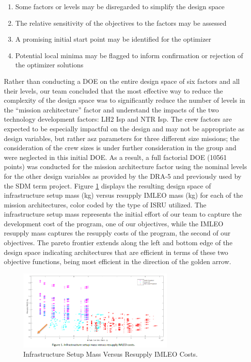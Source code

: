 \documentclass[]{aiaa-pretty}
\begin{document}
\begin{enumerate}
\item Some factors or levels may be disregarded to simplify the design space
\item The relative sensitivity of the objectives to the factors may be assessed
\item A promising initial start point may be identified for the optimizer
\item Potential local minima may be flagged to inform confirmation or rejection of the optimizer solutions
\end{enumerate}
Rather than conducting a DOE on the entire design space of six factors and all their levels, our team concluded that the most effective way to reduce the complexity of the design space was to significantly reduce the number of levels in the “mission architecture” factor and understand the impacts of the two technology development factors: LH2 Isp and NTR Isp. The crew factors are expected to be especially impactful on the design and may not be appropriate as design variables, but rather asz parameters for three different size missions; the consideration of the crew sizes is under further consideration in the group and were neglected in this initial DOE. As a result, a full factorial DOE (10561 points) was conducted for the mission architecture factor using the nominal levels for the other design variables as provided by the DRA-5 and previously used by the SDM term project. Figure \ref{fig:infratrade} displays the resulting design space of infrastructure setup mass (kg) versus resupply IMLEO mass (kg) for each of the mission architectures, color coded by the type of ISRU utilized. The infrastructure setup mass represents the initial effort of our team to capture the development cost of the program, one of our objectives, while the IMLEO resupply mass captures the resupply costs of the program, the second of our objectives. The pareto frontier extends along the left and bottom edge of the design space indicating architectures that are efficient in terms of these two objective functions, being most efficient in the direction of the golden arrow.

\begin{figure}[h!]
	\centering
	\includegraphics[width=0.7\textwidth]{InfraTrade}
	\caption{Infrastructure Setup Mass Versus Resupply IMLEO Costs.}
	\label{fig:infratrade}
\end{figure}
\end{document}
